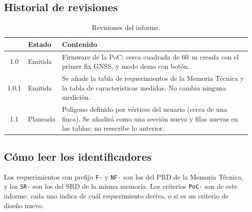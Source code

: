 \subsection{Historial de revisiones}

\begin{table}[H]
\centering
\small
\begin{tabularx}{\textwidth}{|c l X|}
\hline
\tablehead{\textbf{Rev.} & \textbf{Estado} & \textbf{Contenido}} \\ \hline
1.0 & Emitida & Firmware de la PoC: cerca cuadrada de 60~m creada con el primer fix GNSS, y modo demo con botón. \\ \hline
1.0.1 & Emitida & Se añade la tabla de requerimientos de la Memoria Técnica y la tabla de características medidas. No cambia ninguna medición. \\ \hline
1.1 & Planeada & Polígono definido por vértices del usuario (cerca de una finca). Se añadirá como una sección nueva y filas nuevas en las tablas; no reescribe lo anterior. \\ \hline
\end{tabularx}
\caption{Revisiones del informe.}
\end{table}

\subsection{Cómo leer los identificadores}

Los requerimientos con prefijo \texttt{F-} y \texttt{NF-} son los del PRD de la Memoria Técnica,
y los \texttt{SR-} son los del SRD de la misma memoria. Los criterios \texttt{PoC-} son de este
informe: cada uno indica de cuál requerimiento deriva, o si es un criterio de diseño nuevo.
